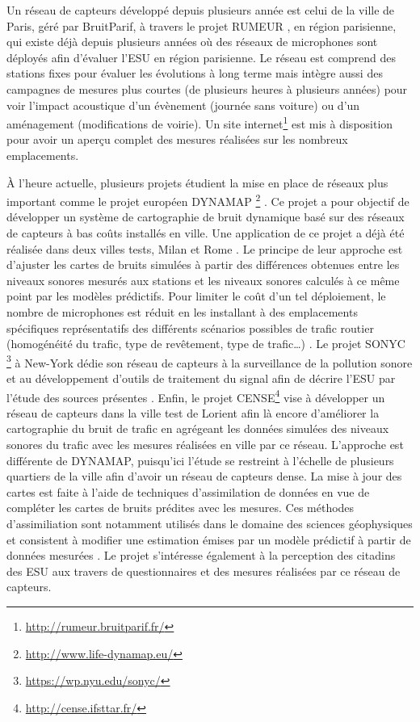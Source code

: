 
Un réseau de capteurs développé depuis plusieurs année est celui de la ville de Paris, géré par BruitParif, à travers le projet RUMEUR \cite{mietlicki2012innovative}, en région parisienne, qui existe déjà depuis plusieurs années où des réseaux de microphones sont déployés afin d'évaluer l'ESU en région parisienne. Le réseau est comprend des stations fixes pour évaluer les évolutions à long terme mais intègre aussi des campagnes de mesures plus courtes (de plusieurs heures à plusieurs années) pour voir l'impact acoustique d'un évènement (journée sans voiture) ou d'un aménagement (modifications de voirie). Un site internet\footnote{\url{http://rumeur.bruitparif.fr/}} est mis à disposition pour avoir un aperçu complet des mesures réalisées sur les nombreux emplacements.

\`A l'heure actuelle, plusieurs projets étudient la mise en place de réseaux plus important comme le projet européen DYNAMAP \footnote{\url{http://www.life-dynamap.eu/}} \cite{dynamap_2016}. Ce projet a pour objectif de développer un système de cartographie de bruit dynamique basé sur des réseaux de capteurs à bas coûts installés en ville. Une application de ce projet a déjà été réalisée dans deux villes tests, Milan et Rome \cite{bellucci_life_2017}.
Le principe de leur approche est d'ajuster les cartes de bruits simulées à partir des différences obtenues entre les niveaux sonores mesurés aux stations et les niveaux sonores calculés à ce même point par les modèles prédictifs. Pour limiter le coût d'un tel déploiement, le nombre de microphones est réduit en les installant à des emplacements spécifiques représentatifs des différents scénarios possibles de trafic routier (homogénéité du trafic, type de revêtement, type de trafic\dots) \cite{zambon2017life}.
Le projet SONYC \footnote{\url{https://wp.nyu.edu/sonyc/}} à New-York dédie son réseau de capteurs à la surveillance de la pollution sonore et au développement d'outils de traitement du signal afin de décrire l'ESU par l'étude des sources présentes \cite{mydlarz2017noise}. 
Enfin, le projet CENSE\footnote{\url{http://cense.ifsttar.fr/}} vise à développer un réseau de capteurs dans la ville test de Lorient afin là encore d'améliorer la cartographie du bruit de trafic en agrégeant les données simulées des niveaux sonores du trafic avec les mesures réalisées en ville par ce réseau. L'approche est différente de DYNAMAP, puisqu'ici l'étude se restreint à l'échelle de plusieurs quartiers de la ville afin d'avoir un réseau de capteurs dense. La mise à jour des cartes est faite à l'aide de techniques d'assimilation de données en vue de compléter les cartes de bruits prédites avec les mesures.
Ces méthodes d'assimiliation sont notamment utilisés dans le domaine des sciences géophysiques et consistent à modifier une estimation émises par un modèle prédictif à partir de données mesurées \cite{wu2008comparison}.
Le projet s'intéresse également à la perception des citadins des ESU aux travers de questionnaires et des mesures réalisées par ce réseau de capteurs.


